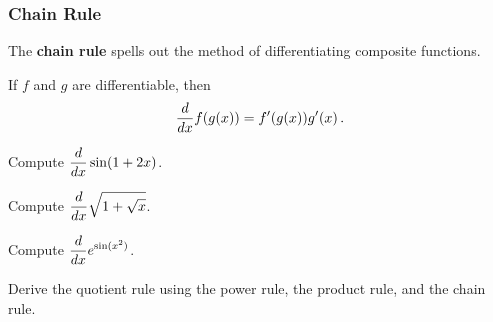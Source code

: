 \documentclass[10pt,t,presentation,ignorenonframetext,aspectratio=169]{beamer}
\title[\course]{\lecTitle}
\institute[Ohio State]
{
  \medskip
}
\date[\week]{\semester}
\author{Tae Eun Kim, Ph.D.}
\begin{document}
\begin{frame}
  \titlepage
\end{frame}

\begin{frame}
  \frametitle{Chain Rule}
  The \textbf{chain rule} spells out the method of differentiating composite functions.
  \begin{thm}
    If $f$ and $g$ are differentiable, then
    \[
      \frac{d}{\mathop{}\!d x} f(g(x)) = f'(g(x))g'(x) \,.
    \]
  \end{thm}
\end{frame}

\begin{frame}
  \vs
  \question{} Compute $\displaystyle \frac{d}{\mathop{}\!d x} \sin(1+2x)$.
\end{frame}

\begin{frame}
  \vs
  \question{} Compute $\displaystyle \frac{d}{\mathop{}\!d x} \sqrt{1+\sqrt{x}}$.
\end{frame}

\begin{frame}
  \vs
  \question{} Compute $\displaystyle \frac{d}{\mathop{}\!d x} e^{\sin(x^2)}$.
\end{frame}

\begin{frame}
  \vs
  \question{} Derive the quotient rule using the power rule, the
  product rule, and the chain rule.
\end{frame}
\end{document}
